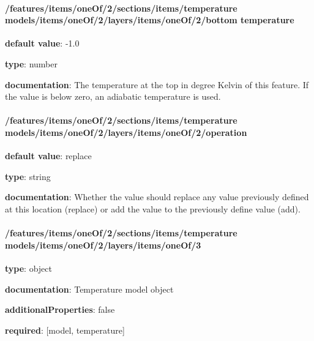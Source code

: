 \begin{itemized}
\end{itemized}\paragraph{/features/items/oneOf/2/sections/items/temperature models/items/oneOf/2/layers/items/oneOf/2/bottom temperature} \begin{itemized}
\item {\bf default value}: -1.0
\item {\bf type}: number
\item {\bf documentation}: The temperature at the top in degree Kelvin of this feature. If the value is below zero, an adiabatic temperature is used.
\end{itemized}\paragraph{/features/items/oneOf/2/sections/items/temperature models/items/oneOf/2/layers/items/oneOf/2/operation} \begin{itemized}
\item {\bf default value}: replace
\item {\bf type}: string
\item {\bf documentation}: Whether the value should replace any value previously defined at this location (replace) or add the value to the previously define value (add).
\end{itemized}\paragraph{/features/items/oneOf/2/sections/items/temperature models/items/oneOf/2/layers/items/oneOf/3} \begin{itemized}
\item {\bf type}: object
\item {\bf documentation}: Temperature model object
\item {\bf additionalProperties}: false
\item {\bf required}: [model, temperature]\end{itemized}
